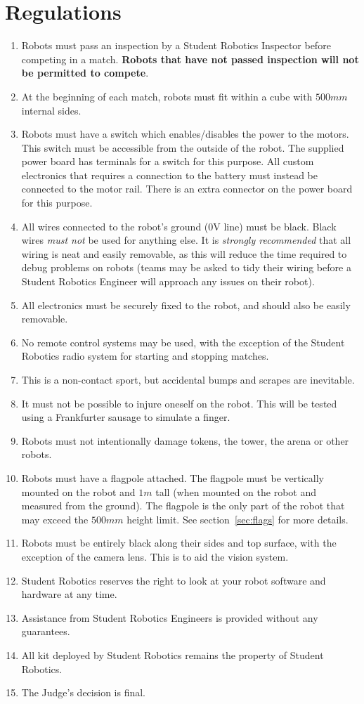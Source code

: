 \section {Regulations}
\label{regs}

\begin{enumerate}
\item Robots must pass an inspection by a Student Robotics Inspector before competing in a match.
 \textbf{Robots that have not passed inspection will not be permitted to compete}.
\item At the beginning of each match, robots must fit within a cube with $500mm$ internal sides.
\item Robots must have a switch which enables/disables the power to the motors.
 This switch must be accessible from the outside of the robot.
 The supplied power board has terminals for a switch for this purpose.
 All custom electronics that requires a connection to the battery must instead be connected to the motor rail.
 There is an extra connector on the power board for this purpose.
\item All wires connected to the robot's ground (0V line) must be black.
 Black wires \emph{must not} be used for anything else.
 It is \emph{strongly recommended} that all wiring is neat and easily removable, as this will reduce the time required to debug problems on robots (teams may be asked to tidy their wiring before a Student Robotics Engineer will approach any issues on their robot).
\item All electronics must be securely fixed to the robot, and should also be easily removable.
\item No remote control systems may be used, with the exception of the Student Robotics radio system for starting and stopping matches.
\item This is a non-contact sport, but accidental bumps and scrapes are inevitable.
\item It must not be possible to injure oneself on the robot.
 This will be tested using a Frankfurter sausage to simulate a finger.
\item Robots must not intentionally damage tokens, the tower, the arena or other robots.
\item Robots must have a flagpole attached.
 The flagpole must be vertically mounted on the robot and $1m$ tall (when mounted on the robot and measured from the ground).
 The flagpole is the only part of the robot that may exceed the $500mm$ height limit.
 See section~\ref{sec:flags} for more details.
\item Robots must be entirely black along their sides and top surface, with the exception of the camera lens.
 This is to aid the vision system.
\item Student Robotics reserves the right to look at your robot software and hardware at any time.
\item Assistance from Student Robotics Engineers is provided without any guarantees.
\item All kit deployed by Student Robotics remains the property of Student Robotics.
\item The Judge's decision is final.


\end{enumerate}
